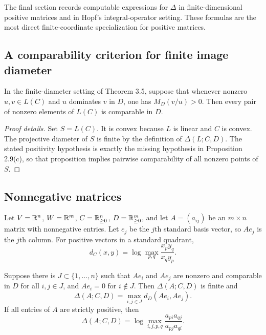 The final section records computable expressions for $\Delta$ in finite-dimensional positive matrices and in Hopf's integral-operator setting.
These formulas are the most direct finite-coordinate specialization for positive matrices.

\subsection{A comparability criterion for finite image diameter}
\begin{lemma}
In the finite-diameter setting of Theorem 3.5, suppose that whenever nonzero $u,v\in L(C)$ and $u$ dominates $v$ in $D$, one has $M_D(v/u)>0$.
Then every pair of nonzero elements of $L(C)$ is comparable in $D$.
\end{lemma}

\begin{proof}[Proof details]
Set $S=L(C)$.
It is convex because $L$ is linear and $C$ is convex.
The projective diameter of $S$ is finite by the definition of $\Delta(L;C,D)$.
The stated positivity hypothesis is exactly the missing hypothesis in Proposition 2.9(c), so that proposition implies pairwise comparability of all nonzero points of $S$.
\end{proof}

\subsection{Nonnegative matrices}
Let $V=\mathbb{R}^n$, $W=\mathbb{R}^m$, $C=\mathbb{R}^n_{\ge0}$, $D=\mathbb{R}^m_{\ge0}$, and let $A=(a_{ij})$ be an $m\times n$ matrix with nonnegative entries.
Let $e_j$ be the $j$th standard basis vector, so $Ae_j$ is the $j$th column.
For positive vectors in a standard quadrant,
\[
  d_C(x,y)=\log\max_{p,q}\frac{x_p y_q}{x_q y_p}.
\]

\begin{theorem}
Suppose there is $J\subset\{1,
\ldots,n\}$ such that $Ae_i$ and $Ae_j$ are nonzero and comparable in $D$ for all $i,j\in J$, and $Ae_i=0$ for $i\notin J$.
Then $\Delta(A;C,D)$ is finite and
\[
  \Delta(A;C,D)=\max_{i,j\in J}d_D(Ae_i,Ae_j).
\]
If all entries of $A$ are strictly positive, then
\[
  \Delta(A;C,D)
  =\log\max_{i,j,p,q}\frac{a_{p i}a_{q j}}{a_{p j}a_{q i}}.
\]
\end{theorem}

